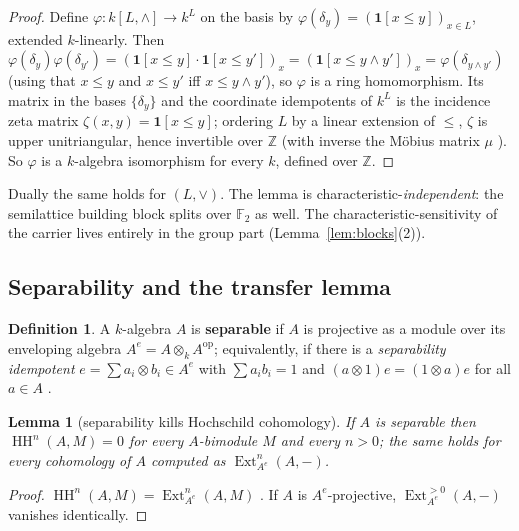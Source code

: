 \documentclass[11pt]{article}
\newtheorem{lemma}[theorem]{Lemma}
\theoremstyle{definition}
\newtheorem{definition}[theorem]{Definition}
\theoremstyle{remark}
\newcommand{\F}{\mathbb{F}}
\newcommand{\Z}{\mathbb{Z}}
\newcommand{\Ext}{\operatorname{Ext}}
\newcommand{\HH}{\operatorname{HH}}
\begin{document}
\begin{proof}
Define $\varphi:k[L,\wedge]\to k^L$ on the basis by $\varphi(\delta_y)=(\mathbf 1[x\le y])_{x\in L}$, extended $k$-linearly. Then
$\varphi(\delta_y)\varphi(\delta_{y'})=(\mathbf 1[x\le y]\cdot\mathbf 1[x\le y'])_x=(\mathbf 1[x\le y\wedge y'])_x=\varphi(\delta_{y\wedge y'})$
(using that $x\le y$ and $x\le y'$ iff $x\le y\wedge y'$), so $\varphi$ is a ring homomorphism. Its matrix in the bases $\{\delta_y\}$ and the coordinate idempotents of $k^L$ is the incidence zeta matrix $\zeta(x,y)=\mathbf 1[x\le y]$; ordering $L$ by a linear extension of $\le$, $\zeta$ is upper unitriangular, hence invertible over $\Z$ (with inverse the M\"obius matrix $\mu$ \cite{rota}). So $\varphi$ is a $k$-algebra isomorphism for every $k$, defined over $\Z$.
\end{proof}

Dually the same holds for $(L,\vee)$. The lemma is characteristic-\emph{independent}: the semilattice building block splits over $\F_2$ as well. The characteristic-sensitivity of the carrier lives entirely in the group part (Lemma~\ref{lem:blocks}(2)).

\subsection{Separability and the transfer lemma}

\begin{definition}
A $k$-algebra $A$ is \textbf{separable} if $A$ is projective as a module over its enveloping algebra $A^e=A\otimes_k A^{\mathrm{op}}$; equivalently, if there is a \emph{separability idempotent} $e=\sum a_i\otimes b_i\in A^e$ with $\sum a_ib_i=1$ and $(a\otimes1)e=(1\otimes a)e$ for all $a\in A$ \cite{demeyer}.
\end{definition}

\begin{lemma}[separability kills Hochschild cohomology]\label{lem:sep}
If $A$ is separable then $\HH^n(A,M)=0$ for every $A$-bimodule $M$ and every $n>0$; the same holds for every cohomology of $A$ computed as $\Ext^n_{A^e}(A,-)$.
\end{lemma}

\begin{proof}
$\HH^n(A,M)=\Ext^n_{A^e}(A,M)$ \cite[Ch.~IX]{cartaneilenberg}. If $A$ is $A^e$-projective, $\Ext^{>0}_{A^e}(A,-)$ vanishes identically.
\end{proof}
\end{document}

